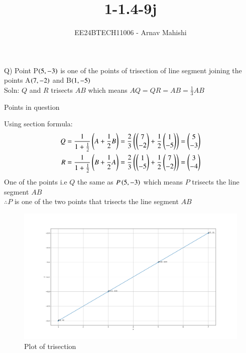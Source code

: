 \documentclass[journal]{IEEEtran}
\begin{document}

\vspace{3cm}

\title{1-1.4-9j}
\author{EE24BTECH11006 - Arnav Mahishi}
{\let\newpage\relax\maketitle}

\renewcommand{\thefigure}{\theenumi}
\renewcommand{\thetable}{\theenumi}
\setlength{\intextsep}{10pt} %


\renewcommand{\thetable}{\theenumi}

Q) Point P$\left(5,-3\right)$ is one of the points of trisection of line segment joining the points A$\left(7,-2\right)$ and B$\left(1,-5\right)$
\\Soln: $Q$ and $R$ trisects $AB$ which means $AQ=QR=AB=\frac{1}{3}AB$ \\
\begin{table}[h!]    
  \centering
  
  \caption{Points in question}
\end{table}
Using section formula:\\
\begin{align}
Q=\frac{1}{1+\frac{1}{2}}\left(A+\frac{1}{2}B\right)=
\frac{2}{3}\left(\begin{pmatrix}7\\-2\end{pmatrix}+\frac{1}{2}\begin{pmatrix}1\\-5\end{pmatrix}\right)=\begin{pmatrix}5\\-3\end{pmatrix}\\
R=\frac{1}{1+\frac{1}{2}}\left(B+\frac{1}{2}A\right)=
\frac{2}{3}\left(\begin{pmatrix}1\\-5\end{pmatrix}+\frac{1}{2}\begin{pmatrix}7\\-2\end{pmatrix}\right)=\begin{pmatrix}3\\-4\end{pmatrix}
\end{align}
One of the points i.e $Q$ the same as $P\left(5,-3\right)$ which means $P$ trisects the line segment $AB$\\
$\therefore P$ is one of the two points that trisects the line segment $AB$
\begin{figure}[h!]
   \centering
   \includegraphics[width=0.7\linewidth]{figs/Figure_1.png}
   \caption{Plot of trisection}
   \label{stemplot}
\end{figure}
\end{document}
